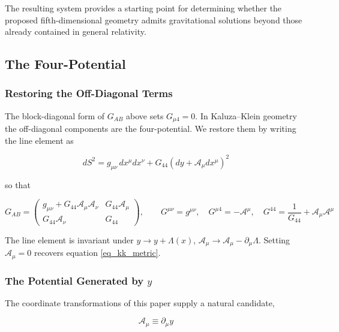 \documentclass[pdflatex,sn-mathphys-num]{sn-jnl}%
\theoremstyle{thmstyleone}%
\theoremstyle{thmstyletwo}%
\theoremstyle{thmstylethree}%
\begin{document}
The resulting system provides a starting point for determining whether the proposed fifth-dimensional geometry admits gravitational solutions beyond those already contained in general relativity.

\subsection{The Four-Potential}\label{sec_four_potential}

\subsubsection{Restoring the Off-Diagonal Terms}

The block-diagonal form of $G_{AB}$ above sets $G_{\mu 4}=0$. In Kaluza--Klein geometry the off-diagonal components are the four-potential. We restore them by writing the line element as

\begin{equation}\label{eq_kk_full}
    dS^2
    =
    g_{\mu\nu}\,dx^\mu dx^\nu
    +
    G_{44}\left(dy+\mathcal{A}_\mu dx^\mu\right)^2
\end{equation}

so that

\begin{equation}
    G_{AB}
    =
    \begin{pmatrix}
        g_{\mu\nu}+G_{44}\mathcal{A}_\mu\mathcal{A}_\nu & G_{44}\mathcal{A}_\mu\\
        G_{44}\mathcal{A}_\nu & G_{44}
    \end{pmatrix},
    \qquad
    G^{\mu\nu}=g^{\mu\nu},\quad
    G^{\mu 4}=-\mathcal{A}^{\mu},\quad
    G^{44}=\frac{1}{G_{44}}+\mathcal{A}_\mu\mathcal{A}^\mu
\end{equation}

The line element is invariant under $y\to y+\Lambda(x)$, $\mathcal{A}_\mu\to\mathcal{A}_\mu-\partial_\mu\Lambda$. Setting $\mathcal{A}_\mu=0$ recovers equation \ref{eq_kk_metric}.

\subsubsection{The Potential Generated by $y$}

The coordinate transformations of this paper supply a natural candidate,

\begin{equation}\label{eq_potential_definition}
    \boxed{
    \mathcal{A}_\mu \equiv \partial_\mu y
    }
\end{equation}
\end{document}
